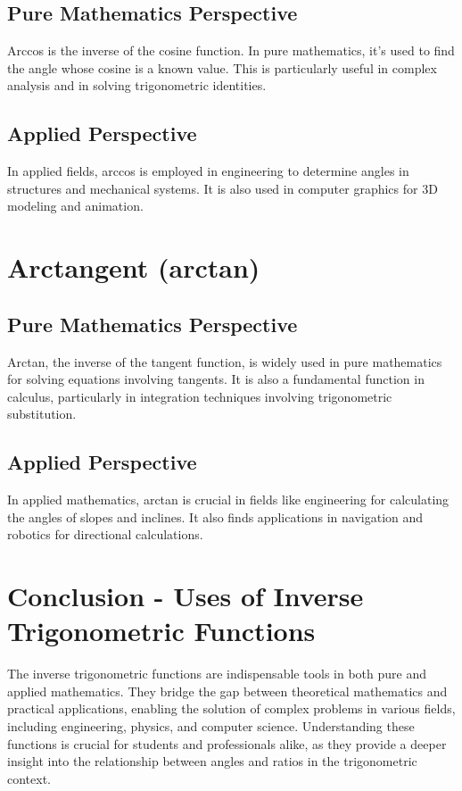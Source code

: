 \documentclass[a4paper,12pt]{book}
\newcounter{problem}
\begin{document}
\subsection*{Pure Mathematics Perspective}
Arccos is the inverse of the cosine function. In pure mathematics, it's used to find the angle whose cosine is a known value. This is particularly useful in complex analysis and in solving trigonometric identities.

\subsection*{Applied Perspective}
In applied fields, arccos is employed in engineering to determine angles in structures and mechanical systems. It is also used in computer graphics for 3D modeling and animation.

\section*{Arctangent (arctan)}
\subsection*{Pure Mathematics Perspective}
Arctan, the inverse of the tangent function, is widely used in pure mathematics for solving equations involving tangents. It is also a fundamental function in calculus, particularly in integration techniques involving trigonometric substitution.

\subsection*{Applied Perspective}
In applied mathematics, arctan is crucial in fields like engineering for calculating the angles of slopes and inclines. It also finds applications in navigation and robotics for directional calculations.

\section*{Conclusion - Uses of Inverse Trigonometric Functions}
The inverse trigonometric functions are indispensable tools in both pure and applied mathematics. They bridge the gap between theoretical mathematics and practical applications, enabling the solution of complex problems in various fields, including engineering, physics, and computer science. Understanding these functions is crucial for students and professionals alike, as they provide a deeper insight into the relationship between angles and ratios in the trigonometric context.
\end{document}
